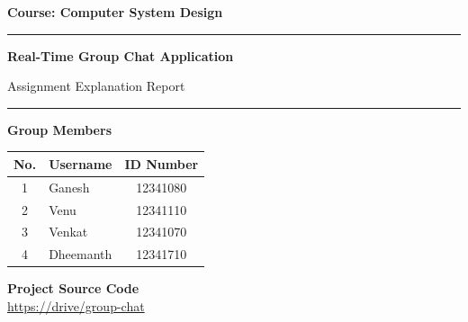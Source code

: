 \documentclass[11pt,a4paper]{article}
\begin{document}
\thispagestyle{empty}


\begin{center}

    \vspace*{1.5cm}

    {\large \bfseries \color{secondaryblue} Course: Computer System Design}

    \vspace{0.5cm}
    \rule{\textwidth}{1.5pt}
    \vspace{0.3cm}

    {\Huge \bfseries \color{primaryblue} Real-Time Group Chat Application}

    \vspace{0.3cm}
    {\large \color{darkgray} Assignment Explanation Report}

    \vspace{0.3cm}
    \rule{\textwidth}{1.5pt}

    \vspace{1cm}

    {\large \bfseries \color{darkgray} Group Members}

    \vspace{0.4cm}

    \begin{tabular}{clc}
        \toprule
        \textbf{No.} & \textbf{Username} & \textbf{ID Number} \\
        \midrule
        1 & Ganesh     & 12341080 \\
        2 & Venu       & 12341110 \\
        3 & Venkat     & 12341070 \\
        4 & Dheemanth  & 12341710 \\
        \bottomrule
    \end{tabular}

    \vspace{1cm}

    \begin{mdframed}[
        backgroundcolor=lightgray,
        linecolor=secondaryblue,
        linewidth=1.2pt,
        roundcorner=6pt,
        innertopmargin=10pt,
        innerbottommargin=10pt
    ]
        \centering
        \textbf{\color{darkgray} Project Source Code}\\[4pt]
        \url{https://drive/group-chat}
    \end{mdframed}

    \vspace{1.5cm}

\end{center}
\end{document}
